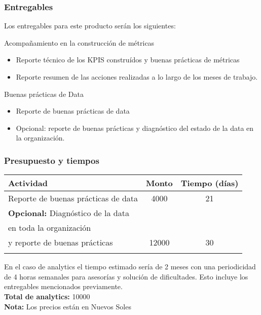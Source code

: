 \documentclass{beamer}
\begin{document}
\begin{frame}
\frametitle{Entregables}

Los entregables para este producto serán los siguientes:


\begin{block}{Acompañamiento en la construcción de métricas}
\begin{itemize}
\item Reporte técnico de los KPIS construídos y buenas prácticas de métricas
\item Reporte resumen de las acciones realizadas a lo largo de los meses de trabajo. 
\end{itemize}
\end{block}

\begin{block}{Buenas prácticas de Data}
\begin{itemize}
\item Reporte de buenas prácticas de data
\item Opcional: reporte de buenas prácticas y diagnóstico del estado de la data en la organización. 
\end{itemize}
\end{block}
\end{frame}

\begin{frame}
\frametitle{Presupuesto y tiempos}
\begin{table}[ht]
\begin{tabular}{lcc}
\hline
Actividad & Monto & Tiempo (días)   \\ \hline
Reporte de buenas prácticas de data & 4000 & 21    \\ 
\textbf{Opcional:} Diagnóstico de la data \\ en toda la organización \\ y reporte de buenas prácticas & 12000 & 30   \\ 
\hline 
\\
\end{tabular}
\end{table}

En el caso de analytics el tiempo estimado sería de 2 meses con una periodicidad de 4 horas semanales para asesorías y solución de dificultades. Esto incluye los entregables mencionados previamente. \\

\textbf{Total de analytics:} 10000 \\

\textbf{Nota:} Los precios están en \alert{Nuevos Soles} \\



\end{frame}
\end{document}
